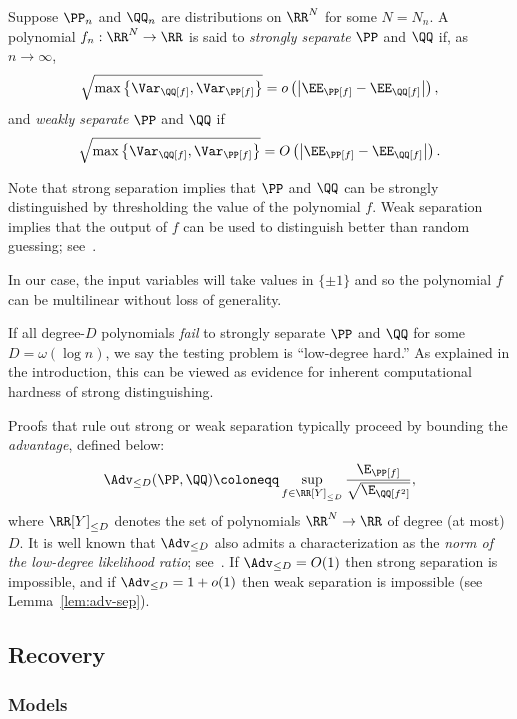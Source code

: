 \documentclass{article}
\begin{document}
\begin{definition}
Suppose $\PP_n$ and $\QQ_n$ are distributions on $\RR^N$ for some $N = N_n$. A polynomial $f_n: \RR^N \to \RR$ is said to \emph{strongly separate} $\PP$ and $\QQ$ if, as $n \to \infty$,
\[ \sqrt{\max\left\{\Var_\QQ[f], \Var_\PP[f]\right\}} = o\left(\left|\EE_\PP[f] - \EE_\QQ[f]\right|\right), \]
and \emph{weakly separate} $\PP$ and $\QQ$ if
\[ \sqrt{\max\left\{\Var_\QQ[f], \Var_\PP[f]\right\}} = O\left(\left|\EE_\PP[f] - \EE_\QQ[f]\right|\right). \]
\end{definition}

Note that strong separation implies that $\PP$ and $\QQ$ can be strongly distinguished by thresholding the value of the polynomial $f$. Weak separation implies that the output of $f$ can be used to distinguish better than random guessing; see~\cite[Proposition~6.1]{fp}.

In our case, the input variables will take values in $\{\pm 1\}$ and so the polynomial $f$ can be multilinear without loss of generality.

If all degree-$D$ polynomials \emph{fail} to strongly separate $\PP$ and $\QQ$ for some $D = \omega(\log n)$, we say the testing problem is ``low-degree hard.'' As explained in the introduction, this can be viewed as evidence for inherent computational hardness of strong distinguishing.

Proofs that rule out strong or weak separation typically proceed by bounding the {\em advantage}, defined below:
\begin{equation}\label{eq:adv}
\Adv_{\le D}(\PP,\QQ) \coloneqq \sup_{f \in \RR[Y]_{\le D}} \frac{\E_\PP[f]}{\sqrt{\E_\QQ[f^2]}},
\end{equation}
where $\RR[Y]_{\le D}$ denotes the set of polynomials $\RR^N \to \RR$ of degree (at most) $D$. It is well known that $\Adv_{\le D}$ also admits a characterization as the \emph{norm of the low-degree likelihood ratio}; see~\cite{hopkins-thesis,ld-notes}. If $\Adv_{\le D} = O(1)$ then strong separation is impossible, and if $\Adv_{\le D} = 1 + o(1)$ then weak separation is impossible (see Lemma~\ref{lem:adv-sep}).





\subsection{Recovery}

\subsubsection{Models}
\end{document}

